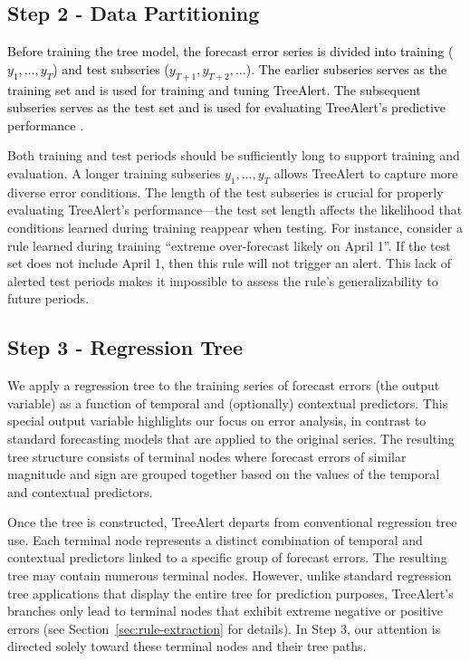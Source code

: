 \documentclass[]{interact}
\theoremstyle{plain}
\theoremstyle{definition}
\theoremstyle{remark}
\newcommand{\matt}[1]{\textcolor{black}{#1}}
\begin{document}
\subsection{Step 2 - Data Partitioning}

\matt{Before training the tree model, the forecast error series is divided into training
($y_1, \ldots, y_T$) and test subseries ($y_{T+1}, y_{T+2}, \ldots$). The earlier subseries
serves as the training set and is used for training and tuning TreeAlert. The subsequent
subseries serves as the test set and is used for evaluating TreeAlert's predictive
performance \citep{shmueli2024}.}

Both training and test periods should be sufficiently long to support training and
evaluation. A longer training subseries $y_1, \ldots, y_T$ allows TreeAlert to capture more
diverse error conditions. The length of the test subseries is crucial for properly evaluating
TreeAlert's performance---the test set length affects the likelihood that conditions learned
during training reappear when testing. For instance, consider a rule learned during training
``extreme over-forecast likely on April 1''. If the test set does not include April 1, then
this rule will not trigger an alert. This lack of alerted test periods makes it impossible to
assess the rule's generalizability to future periods.

\subsection{Step 3 - Regression Tree}

We apply a regression tree to the training series of forecast errors (the output variable)
as a function of temporal and (optionally) contextual predictors. This special output
variable highlights our focus on error analysis, in contrast to standard forecasting models
that are applied to the original series. The resulting tree structure consists of terminal
nodes where forecast errors of similar magnitude and sign are grouped together based on the
values of the temporal and contextual predictors.

Once the tree is constructed, TreeAlert departs from conventional regression tree use. Each
terminal node represents a distinct combination of temporal and contextual predictors linked
to a specific group of forecast errors. The resulting tree may contain numerous terminal
nodes. However, unlike standard regression tree applications that display the entire tree for
prediction purposes, TreeAlert's branches only lead to terminal nodes that exhibit extreme
negative or positive errors (see Section~\ref{sec:rule-extraction} for details). In Step 3,
our attention is directed solely toward these terminal nodes and their tree paths.
\end{document}
